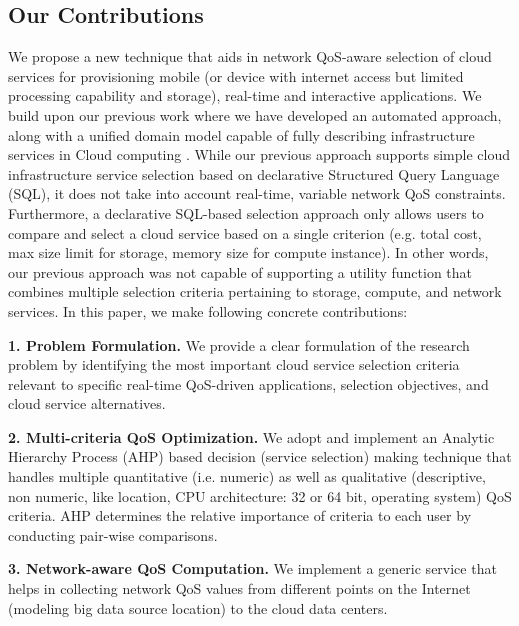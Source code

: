 \documentclass[journal]{IEEEtran}
\begin{document}
\subsection{Our Contributions }
We propose a new technique that aids in network QoS-aware selection of cloud services for provisioning mobile (or device with internet access but limited processing capability and storage), real-time and interactive applications. We build upon our previous work \cite{zhang2013investigating} where we have developed an automated approach, along with a unified domain model capable of fully describing infrastructure services in Cloud computing    \cite{zhang2012ontology}   \cite{zhang2012declarative}. While our previous approach supports simple cloud infrastructure service selection based on declarative Structured Query Language (SQL), it does not take into account real-time, variable network QoS constraints. Furthermore, a declarative SQL-based selection approach only allows users to compare and select a cloud service based on a single criterion (e.g. total cost, max size limit for storage, memory size for compute instance). In other words, our previous approach was not capable of supporting a utility function that combines multiple selection criteria pertaining to storage, compute, and network services.  In this paper, we make following concrete contributions:

\textbf{1. Problem Formulation.} We provide a clear formulation of the research problem by identifying the most important cloud service selection criteria relevant to specific real-time QoS-driven applications, selection objectives, and cloud service alternatives.

\textbf{2. Multi-criteria QoS Optimization.} We adopt and implement an Analytic Hierarchy Process (AHP) based decision (service selection) making technique that handles multiple quantitative (i.e. numeric) as well as qualitative (descriptive, non numeric, like location, CPU architecture: 32 or 64 bit, operating system) QoS criteria. AHP determines the relative importance of criteria to each user by conducting pair-wise comparisons.

\textbf{3. Network-aware QoS Computation.} We implement a generic service that helps in collecting network QoS values from different points on the Internet (modeling big data source location) to the cloud data centers.
\end{document}
